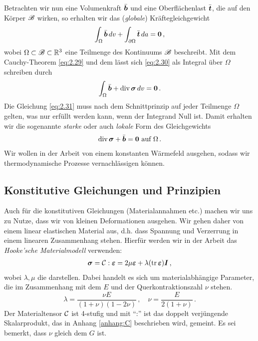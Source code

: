 Betrachten wir nun eine Volumenkraft $\bar{\boldsymbol b}$ und eine Oberflächenlast $\bar{\boldsymbol t}$, die auf den Körper $\mathscr B$ wirken, so erhalten wir das (\textit{globale}) Kräftegleichgewicht
\begin{align}\label{eq:2.30}
	\int_{\Omega} \bar{\boldsymbol b} \, dv + \int_{\partial \Omega} \bar{\boldsymbol t} \, da = \boldsymbol 0 \, ,
\end{align}
wobei $\Omega \subset \mathscr B \subset \mathbb{R}^3$ eine Teilmenge des Kontinuums $\mathscr B$ beschreibt. Mit dem Cauchy-Theorem \eqref{eq:2.29} und dem  lässt sich \eqref{eq:2.30} als Integral über $\Omega$ schreiben durch
\begin{align}\label{eq:2.31}
	\int_{\Omega} \bar{\boldsymbol b} + \operatorname{div} \boldsymbol\sigma \, dv = \boldsymbol 0 \, .
\end{align}
Die Gleichung \eqref{eq:2.31} muss nach dem Schnittprinzip auf jeder Teilmenge $\Omega$ gelten, was nur erfüllt werden kann, wenn der Integrand Null ist. Damit erhalten wir die sogenannte \textit{starke} oder auch \textit{lokale} Form des Gleichgewichts
\begin{align}\label{eq:2.32}
	\operatorname{div} \boldsymbol \sigma + \bar{\boldsymbol b} = \boldsymbol 0 \text{ auf } \Omega \, .
\end{align}
Wir wollen in der Arbeit von einem konstanten Wärmefeld ausgehen, sodass wir thermodynamische Prozesse vernachlässigen können.

\subsection{Konstitutive Gleichungen und Prinzipien}
\label{kap:2.5.3}


Auch für die konstitutiven Gleichungen (Materialannahmen etc.) machen wir uns zu Nutze, dass wir von kleinen Deformationen ausgehen. Wir gehen daher von einem linear elastischen Material aus, d.h. dass Spannung und Verzerrung in einem linearen Zusammenhang stehen. Hierfür werden wir in der Arbeit das \textit{Hooke'sche Materialmodell} verwenden:
\begin{align}\label{eq:2.33}
	\boldsymbol \sigma = \mathcal C :\boldsymbol {\varepsilon} = 2 \mu \boldsymbol {\varepsilon} + \lambda (\operatorname{tr} \boldsymbol {\varepsilon}) \boldsymbol I \, ,
\end{align}
wobei $\lambda, \mu$ die \textit{} darstellen. Dabei handelt es sich um materialabhängige Parameter, die im Zusammenhang mit dem  $E$ und der Querkontraktionszahl $\nu$ stehen.
\[
	\lambda = \frac{\nu E}{(1+\nu)(1-2\nu)} \, ,\quad \nu = \frac E{2(1+\nu)} \, .
\]
Der Materialtensor $\mathcal C$ ist 4-stufig und mit "`:"' ist das doppelt verjüngende Skalarprodukt, das in Anhang \ref{anhang:C} beschrieben wird, gemeint. Es sei bemerkt, dass $\nu$ gleich dem  $G$ ist.


